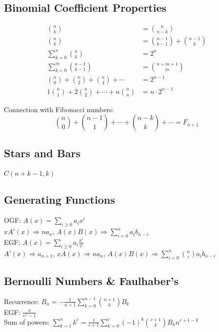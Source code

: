 \subsection{Binomial Coefficient Properties}
\begin{align*}
\binom{n}{k} &= \binom{n}{n-k} \\[2pt]
\binom{n}{k} &= \binom{n-1}{k-1} + \binom{n-1}{k} \\[2pt]
\sum_{k=0}^{n} \binom{n}{k} &= 2^{n} \\[2pt]
\sum_{k=0}^{m} \binom{n-1}{k-1} &= \binom{n+m+1}{m} \\[2pt]
\binom{n}{0} + \binom{n}{2} + \binom{n}{4} + \cdots &= 2^{n-1} \\[2pt]
1\binom{n}{1} + 2\binom{n}{2} + \cdots + n\binom{n}{n} &= n \cdot 2^{n-1}
\end{align*}

Connection with Fibonacci numbers:
\[
\binom{n}{0} + \binom{n-1}{1} + \cdots + \binom{n-k}{k} + \cdots = F_{n+1}
\]

\subsection{Stars and Bars}
$C(n + k - 1, k)$

\subsection{Generating Functions}
\textbullet{} OGF: $A(x) = \sum_{i \ge 0} a_i x^i$ \\
\textbullet{} $xA'(x) \Rightarrow n a_n$,
$A(x)B(x) \Rightarrow \sum_{i=0}^n a_i b_{n-i}$ \\
\textbullet{} EGF: $A(x) = \sum_{i \ge 0} a_i \frac{x^i}{i!}$ \\
\textbullet{} $A'(x) \Rightarrow a_{n+1}$,
$xA(x) \Rightarrow n a_n$,
$A(x)B(x) \Rightarrow \sum_{i=0}^n \binom{n}{i} a_i b_{n-i}$

\subsection{Bernoulli Numbers \& Faulhaber's}
\textbullet{} Recurrence: $B_n = -\frac{1}{n+1} \sum_{k=0}^{n-1} \binom{n+1}{k} B_k$ \\
\textbullet{} EGF: $\frac{x}{e^x-1}$ \\
\textbullet{} Sum of powers:
$\sum_{k=1}^n k^c = \frac{1}{c+1} \sum_{k=0}^c (-1)^k \binom{c+1}{k} B_k n^{c+1-k}$
